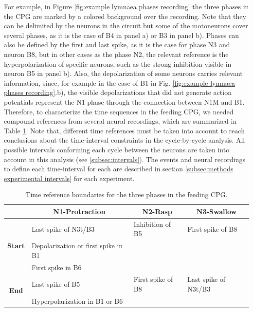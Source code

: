 For example, in Figure \ref{fig:example lymnaea phases recording} the three phases in the CPG are marked by a colored background over the recording. Note that they can be delimited by the neurons in the circuit but some of the motoneurons cover several phases, as it is the case of B4 in panel a) or B3 in panel b). Phases can also be defined by the first and last spike, as it is the case for phase N3 and neuron B8, but in other cases as the phase N2, the relevant reference is the hyperpolarization of specific neurons, such as the strong inhibition visible in neuron B5 in panel b). Also, the depolarization of some neurons carries relevant information, since, for example in the case of B1 in Fig. \ref{fig:example lymnaea phases recording}.b), the visible depolarizations that did not generate action potentials represent the N1 phase through the connection between N1M and B1. Therefore, to characterize the time sequences in the feeding CPG, we needed compound references from several neural recordings, which are summarized in Table \ref{table:cpg ref intervals}. Note that, different time references must be taken into account to reach conclusions about the time-interval constraints in the cycle-by-cycle analysis. All possible intervals conforming each cycle between the neurons are taken into account in this analysis (see \ref{subsec:intervals}). The events and neural recordings to define each time-interval for each are described in section \ref{subsec:methods experimental intervals} for each experiment.


\begin{table}[htb!]
	\centering
	\begin{tabular}{cl|l|l}
			\multicolumn{1}{l}{}                                 & \multicolumn{1}{c|}{\textbf{N1-Protraction}} & \multicolumn{1}{c|}{\textbf{N2-Rasp}} & \multicolumn{1}{c}{\textbf{N3-Swallow}} \\ \hline
			\multicolumn{1}{c|}{\multirow{3}{*}{\textbf{Start}}} & Last spike of N3t/B3                         & Inhibition of B5                      & First spike of B8                       \\
			\multicolumn{1}{c|}{}                                & Depolarization or first spike in B1          &                                       &                                         \\
			\multicolumn{1}{c|}{}                                & First spike in B6                            &                                       &                                         \\ \hline
			\multicolumn{1}{c|}{\multirow{2}{*}{\textbf{End}}}   & Last spike of B5                             & First spike of B8                     & Last spike of N3t/B3                    \\
			\multicolumn{1}{c|}{}                                & Hyperpolarization in B1 or B6                &                                       &                                        
		\end{tabular}
	\caption{Time reference boundaries for the three phases in the feeding CPG.}
	\label{table:cpg ref intervals}
\end{table}

